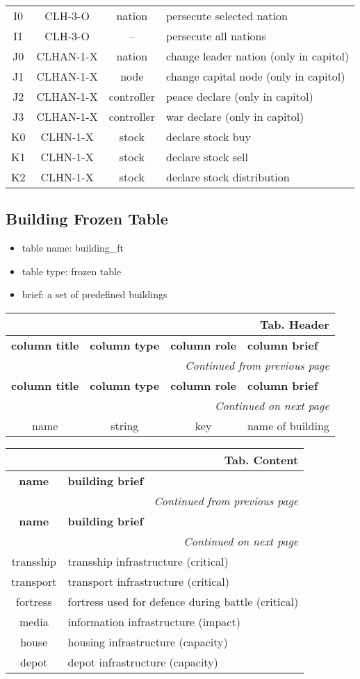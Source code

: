\documentclass[a4paper,oneside,titlepage]{report}
\newcommand*{\LTHeaderII}[3]{
  \multicolumn{2}{r}{\textbf{Tab. \thesubsection} \textbf{#1}}\\    
  \hline
  \textbf{#2} & \textbf{#3}\\
  \hline

  \endfirsthead
  \multicolumn{2}{r}{\textit{Continued from previous page}}\\    
  \hline
  \textbf{#2} & \textbf{#3}\\
  \hline
  \endhead
  \hline
  \multicolumn{2}{r}{\textit{Continued on next page}}\\
  \endfoot
  \hline
  \endlastfoot  
}
\newcommand*{\LTHeaderIV}[5]{
  \multicolumn{4}{r}{\textbf{Tab. \thesubsection} \textbf{#1}}\\    
  \hline
  \textbf{#2} & \textbf{#3} & \textbf{#4} & \textbf{#5}\\
  \hline
  
  \endfirsthead
  \multicolumn{4}{r}{\textit{Continued from previous page}}\\    
  \hline
  \textbf{#2} & \textbf{#3} & \textbf{#4} & \textbf{#5}\\
  \hline
  \endhead
  \hline
  \multicolumn{4}{r}{\textit{Continued on next page}}\\
  \endfoot
  \hline
  \endlastfoot  
}
\begin{document}
\begin{longtable}{ |c|c|c|l| }
  \hline
  I0 & CLH-3-O & nation & persecute selected nation\\
  I1 & CLH-3-O & --     & persecute all nations\\
  \hline
  J0 & CLHAN-1-X & nation     & change leader nation (only in capitol)\\
  J1 & CLHAN-1-X & node       & change capital node (only in capitol)\\
  J2 & CLHAN-1-X & controller & peace declare (only in capitol)\\
  J3 & CLHAN-1-X & controller & war declare (only in capitol)\\
  \hline
  K0 & CLHN-1-X & stock & declare stock buy\\
  K1 & CLHN-1-X & stock & declare stock sell\\
  K2 & CLHN-1-X  & stock & declare stock distribution\\
\end{longtable}

\subsection{Building Frozen Table}
\begin{itemize}
  \setlength{\itemsep}{0pt}
  \setlength{\parskip}{0pt}
\item table name: building\_ft  
\item table type: frozen table   
\item brief: a set of predefined buildings    
\end{itemize}

\vspace{-0.5cm}
\begin{longtable}{ |c|c|c|l| } 
  \LTHeaderIV{Header}{column title}{column type}{column role}{column brief}
  name & string & key & name of building\\
\end{longtable}        

\vspace{-0.5cm}
\begin{longtable}{ |c|l| }    
  \LTHeaderII{Content}{name}{building brief}                    
  transship & transship infrastructure (critical)\\
  transport & transport infrastructure (critical)\\
  fortress & fortress used for defence during battle (critical)\\
  media & information infrastructure (impact)\\
  house & housing infrastructure (capacity)\\
  depot & depot infrastructure (capacity)\\
\end{longtable}
\end{document}
